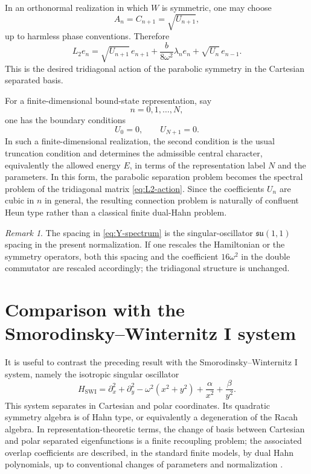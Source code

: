 \documentclass[11pt]{article}
\numberwithin{equation}{section}
\theoremstyle{definition}
\theoremstyle{remark}
\newtheorem{remark}[theorem]{Remark}
\newcommand{\SWI}{\mathrm{SWI}}
\begin{document}
In an orthonormal realization in which \(W\) is symmetric, one may choose
\begin{equation}
        A_n=C_{n+1}=\sqrt{U_{n+1}},
        \label{eq:symmetric-choice}
\end{equation}
up to harmless phase conventions.  Therefore
\begin{equation}
        L_2 e_n
        =
        \sqrt{U_{n+1}}\, e_{n+1}
        +
        \frac{b}{8\omega^2}\lambda_n e_n
        +
        \sqrt{U_n}\, e_{n-1}.
        \label{eq:L2-action}
\end{equation}
This is the desired tridiagonal action of the parabolic symmetry in the
Cartesian separated basis.

For a finite-dimensional bound-state representation, say
\[
        n=0,1,\ldots,N,
\]
one has the boundary conditions
\begin{equation}
        U_0=0,\qquad U_{N+1}=0.
        \label{eq:finite-boundary}
\end{equation}
In such a finite-dimensional realization, the second condition is the usual
truncation condition and determines the admissible central character,
equivalently the allowed energy \(E\), in terms of the representation label
\(N\) and the parameters.  In this form, the parabolic separation problem
becomes the spectral problem of the tridiagonal matrix \eqref{eq:L2-action}.
Since the coefficients \(U_n\) are cubic in \(n\) in general, the resulting
connection problem is naturally of confluent Heun type rather than a classical
finite dual-Hahn problem.

\begin{remark}
The spacing in \eqref{eq:Y-spectrum} is the singular-oscillator
\(\mathfrak{su}(1,1)\) spacing in the present normalization.  If one rescales
the Hamiltonian or the symmetry operators, both this spacing and the
coefficient \(16\omega^2\) in the double commutator are rescaled
accordingly; the tridiagonal structure is unchanged.
\end{remark}

\section{Comparison with the Smorodinsky--Winternitz I system}

It is useful to contrast the preceding result with the 
Smorodinsky--Winternitz I system, namely the isotropic singular oscillator
\begin{equation}
H_{\SWI}
=
\partial_x^2+\partial_y^2
-\omega^2(x^2+y^2)
+\frac{\alpha}{x^2}+\frac{\beta}{y^2}.
\label{eq:SWI}
\end{equation}
This system separates in Cartesian and polar coordinates.  Its quadratic
symmetry algebra is of Hahn type, or equivalently a degeneration of the Racah
algebra.  In representation-theoretic terms, the change of basis between
Cartesian and polar separated eigenfunctions is a finite recoupling problem;
the associated overlap coefficients are described, in the standard finite
models, by dual Hahn polynomials, up to conventional changes of parameters
and normalization \cite{Post2011,KoekoekLeskySwarttouw2010}.
\end{document}
